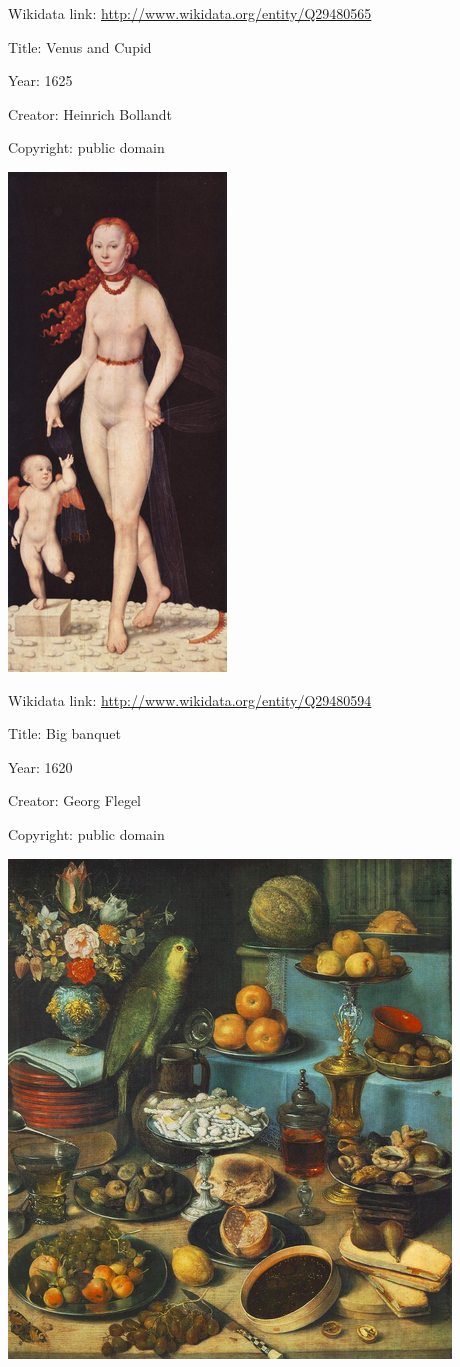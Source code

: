 \documentclass[
  letterpaper,
]{book}
\begin{document}
Wikidata link: \url{http://www.wikidata.org/entity/Q29480565}

Title: Venus and Cupid

Year: 1625

Creator: Heinrich Bollandt

Copyright: public domain

\includegraphics{./paintings_files/figure-pdf/cell-2-output-16.png}

Wikidata link: \url{http://www.wikidata.org/entity/Q29480594}

Title: Big banquet

Year: 1620

Creator: Georg Flegel

Copyright: public domain

\includegraphics{./paintings_files/figure-pdf/cell-2-output-18.png}
\end{document}
